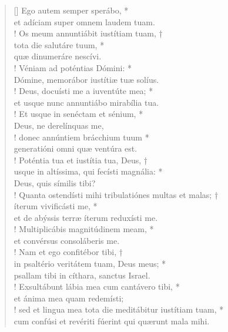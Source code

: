 \begin{verse}[\versewidth]
Ego autem semper sperábo, *\\
et adíciam super omnem laudem tuam.\\!
\vin Os meum annuntiábit iustítiam tuam, †\\
\vin tota die salutáre tuum, *\\
\vin quæ dinumeráre nescívi.\\!
Véniam ad poténtias Dómini: *\\
Dómine, memorábor iustítiæ tuæ solíus.\\!
\vin Deus, docuísti me a iuventúte mea; *\\
\vin et usque nunc annuntiábo mirabília tua.\\!
Et usque in senéctam et sénium, *\\
Deus, ne derelínquas me,\\!
\vin donec annúntiem brácchium tuum *\\
\vin generatióni omni quæ ventúra est.\\!
Poténtia tua et iustítia tua, Deus, †\\
usque in altíssima, qui fecísti magnália: *\\
Deus, quis símilis tibi?\\!
\vin Quanta ostendísti mihi tribulatiónes multas et malas; †\\
\vin íterum vivificásti me, *\\
\vin et de abýssis terræ íterum reduxísti me.\\!
Multiplicábis magnitúdinem meam, *\\
et convérsus consoláberis me.\\!
\vin Nam et ego confitébor tibi, †\\
\vin in psaltério veritátem tuam, Deus meus; *\\
\vin psallam tibi in cíthara, sanctus Israel.\\!
Exsultábunt lábia mea cum cantávero tibi, *\\
et ánima mea quam redemísti;\\!
\vin sed et lingua mea tota die meditábitur iustítiam tuam, *\\
\vin cum confúsi et revériti fúerint qui quærunt mala mihi.\\
\end{verse}
\vspace{1cm}



